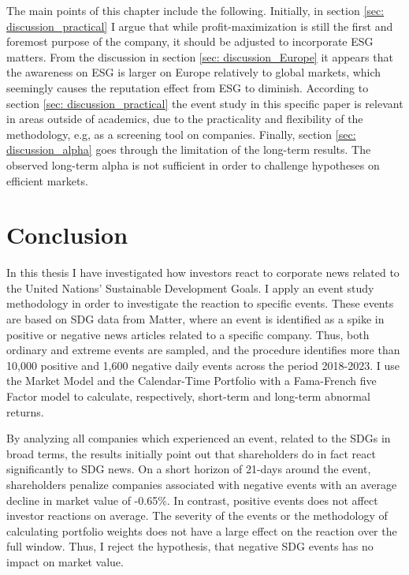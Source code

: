The main points of this chapter include the following. Initially, in section \ref{sec: discussion_practical} I argue that while profit-maximization is still the first and foremost purpose of the company, it should be adjusted to incorporate ESG matters. From the discussion in section \ref{sec: discussion_Europe} it appears that the awareness on ESG is larger on Europe relatively to global markets, which seemingly causes the reputation effect from ESG to diminish. According to section \ref{sec: discussion_practical} the event study in this specific paper is relevant in areas outside of academics, due to the practicality and flexibility of the methodology, e.g, as a screening tool on companies. Finally, section \ref{sec: discussion_alpha} goes through the limitation of the long-term results. The observed long-term alpha is not sufficient in order to challenge hypotheses on efficient markets. 

\pagebreak

\section{Conclusion}

In this thesis I have investigated how investors react to corporate news related to the United Nations' Sustainable Development Goals. I apply an event study methodology in order to investigate the reaction to specific events. These events are based on SDG data from Matter, where an event is identified as a spike in positive or negative news articles related to a specific company. Thus, both ordinary and extreme events are sampled, and the procedure identifies more than 10,000 positive and 1,600 negative daily events across the period 2018-2023. I use the Market Model and the Calendar-Time Portfolio with a Fama-French five Factor model to calculate, respectively, short-term and long-term abnormal returns. 

By analyzing all companies which experienced an event, related to the SDGs in broad terms, the results initially point out that shareholders do in fact react significantly to SDG news. On a short horizon of 21-days around the event, shareholders penalize companies associated with negative events with an average decline in market value of -0.65\%. In contrast, positive events does not affect investor reactions on average. The severity of the events or the methodology of calculating portfolio weights does not have a large effect on the reaction over the full window. Thus, I reject the hypothesis, that negative SDG events has no impact on market value. 

